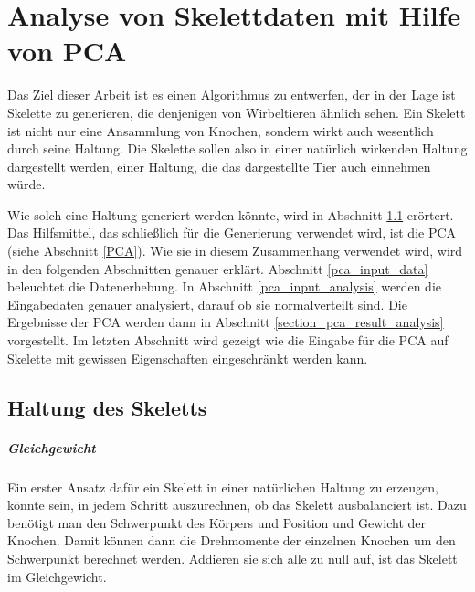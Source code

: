 \chapter{Analyse von Skelettdaten mit Hilfe von PCA}
\label{chapter:pca}

Das Ziel dieser Arbeit ist es einen Algorithmus zu entwerfen, der in der Lage ist Skelette zu generieren, die denjenigen von Wirbeltieren ähnlich sehen.
Ein Skelett ist nicht nur eine Ansammlung von Knochen, sondern wirkt auch wesentlich durch seine Haltung. Die Skelette sollen also in einer natürlich wirkenden Haltung dargestellt werden, einer Haltung, die das dargestellte Tier auch einnehmen würde.

Wie solch eine Haltung generiert werden könnte, wird in Abschnitt \ref{pose} erörtert. Das Hilfsmittel, das schließlich für die Generierung verwendet wird, ist die PCA (siehe Abschnitt \ref{PCA}). Wie sie in diesem Zusammenhang verwendet wird, wird in den folgenden Abschnitten genauer erklärt. Abschnitt \ref{pca_input_data} beleuchtet die Datenerhebung. In Abschnitt \ref{pca_input_analysis} werden die Eingabedaten genauer analysiert, \zb darauf ob sie normalverteilt sind. Die Ergebnisse der PCA werden dann in Abschnitt \ref{section_pca_result_analysis} vorgestellt.
Im letzten Abschnitt wird gezeigt wie die Eingabe für die PCA auf Skelette mit gewissen Eigenschaften eingeschränkt werden kann.

\section{Haltung des Skeletts}
\label{pose}

\paragraph{Gleichgewicht}
Ein erster Ansatz dafür ein Skelett in einer natürlichen Haltung zu erzeugen, könnte sein, in jedem Schritt auszurechnen, ob das Skelett ausbalanciert ist. Dazu benötigt man den Schwerpunkt des Körpers und Position und Gewicht der Knochen.
Damit können dann die Drehmomente der einzelnen Knochen um den Schwerpunkt berechnet werden. Addieren sie sich alle zu null auf, ist das Skelett im Gleichgewicht.

